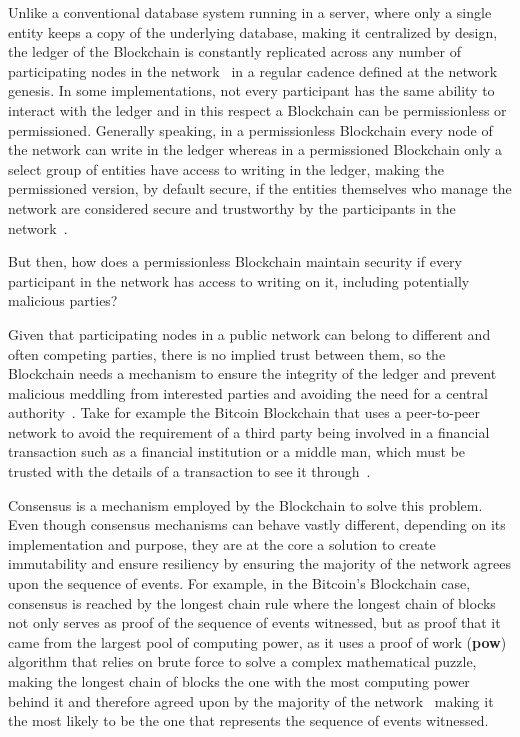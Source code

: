 Unlike a conventional database system running in a server, where only a single
entity keeps a copy of the underlying database, making it centralized by
design, the ledger of the Blockchain is constantly replicated across any number
of participating nodes in the network~\cite{Lewis2015} in a regular cadence
defined at the network genesis. In some implementations, not every participant
has the same ability to interact with the ledger and in this respect a
Blockchain can be permissionless or permissioned. Generally speaking, in a
permissionless Blockchain every node of the network can write in the ledger
whereas in a permissioned Blockchain only a select group of entities have
access to writing in the ledger, making the permissioned version, by default
secure, if the entities themselves who manage the network are considered secure
and trustworthy by the participants in the
network~\cite{Lewis2015,Valenta2017}.

But then, how does a permissionless Blockchain maintain security if every
participant in the network has access to writing on it, including potentially
malicious parties?

Given that participating nodes in a public network can belong to different and
often competing parties, there is no implied trust between them, so the
Blockchain needs a mechanism to ensure the integrity of the ledger and prevent
malicious meddling from interested parties and avoiding the need for a central
authority~\cite{Barclay2017}.  Take for example the Bitcoin Blockchain that
uses a peer-to-peer network to avoid the requirement of a third party being
involved in a financial transaction such as a financial institution or a middle
man, which must be trusted with the details of a transaction to see it
through~\cite{Nakamoto2008}.

Consensus is a mechanism employed by the Blockchain to solve this problem.
Even though consensus mechanisms can behave vastly different, depending on its
implementation and purpose, they are at the core a solution to create
immutability and ensure resiliency by ensuring the majority of the network
agrees upon the sequence of events.  For example, in the Bitcoin's Blockchain
case, consensus is reached by the longest chain rule where the longest chain of
blocks not only serves as proof of the sequence of events witnessed, but as
proof that it came from the largest pool of computing power, as it uses a proof
of work (\textbf{pow}) algorithm that relies on brute force to solve a complex
mathematical puzzle, making the longest chain of blocks the one with the most
computing power behind it and therefore agreed upon by the majority of the
network~\cite{Baars2016,Wood2017} making it the most likely to be the one that
represents the sequence of events witnessed.


